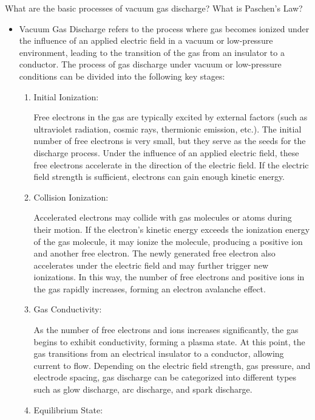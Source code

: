 \begin{question}
	What are the basic processes of vacuum gas discharge? What is Paschen's Law?
\end{question}

\begin{itemize}
	\item Vacuum Gas Discharge refers to the process where gas becomes ionized under the influence of an applied electric field in a vacuum or low-pressure environment, leading to the transition of the gas from an insulator to a conductor. The process of gas discharge under vacuum or low-pressure conditions can be divided into the following key stages:
	\begin{enumerate}
		\item Initial Ionization:
		
		Free electrons in the gas are typically excited by external factors (such as ultraviolet radiation, cosmic rays, thermionic emission, etc.). The initial number of free electrons is very small, but they serve as the seeds for the discharge process. Under the influence of an applied electric field, these free electrons accelerate in the direction of the electric field. If the electric field strength is sufficient, electrons can gain enough kinetic energy.
		
		\item Collision Ionization:
		
		Accelerated electrons may collide with gas molecules or atoms during their motion. If the electron’s kinetic energy exceeds the ionization energy of the gas molecule, it may ionize the molecule, producing a positive ion and another free electron. The newly generated free electron also accelerates under the electric field and may further trigger new ionizations. In this way, the number of free electrons and positive ions in the gas rapidly increases, forming an electron avalanche effect.
		
		\item Gas Conductivity:
		
		As the number of free electrons and ions increases significantly, the gas begins to exhibit conductivity, forming a plasma state. At this point, the gas transitions from an electrical insulator to a conductor, allowing current to flow. Depending on the electric field strength, gas pressure, and electrode spacing, gas discharge can be categorized into different types such as glow discharge, arc discharge, and spark discharge.
		
		\item Equilibrium State:
		

\end{enumerate}
\end{itemize}
